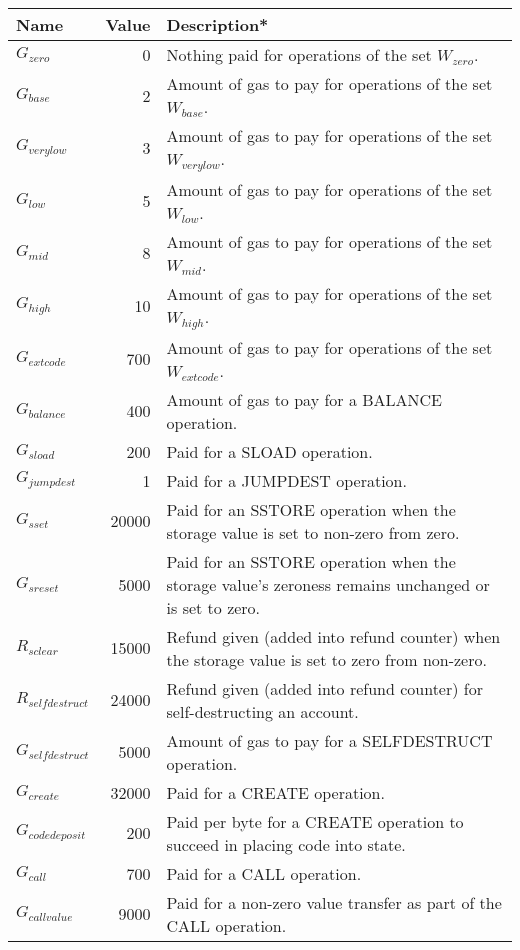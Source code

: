 \documentclass[9pt,oneside]{amsart}
\makeatletter
\newcommand{\linkdest}[1]{\Hy@raisedlink{\hypertarget{#1}{}}}
\makeatother
\begin{document}
\begin{tabular*}{\columnwidth}[h]{lrl}
\toprule
Name & Value & Description* \\
\midrule
$G_{zero}$ & 0 & Nothing paid for operations of the set {\small $W_{zero}$}. \\
$G_{base}$ & 2 & Amount of gas to pay for operations of the set {\small $W_{base}$}. \\
$G_{verylow}$ & 3 & Amount of gas to pay for operations of the set {\small $W_{verylow}$}. \\
$G_{low}$ & 5 & Amount of gas to pay for operations of the set {\small $W_{low}$}. \\
$G_{mid}$ & 8 & Amount of gas to pay for operations of the set {\small $W_{mid}$}. \\
$G_{high}$ & 10 & Amount of gas to pay for operations of the set {\small $W_{high}$}. \\
$G_{extcode}$ & 700 & Amount of gas to pay for operations of the set {\small $W_{extcode}$}. \\
$G_{balance}$ & 400 & Amount of gas to pay for a {\small BALANCE} operation. \\
$G_{sload}$ & 200 & Paid for a {\small SLOAD} operation. \\
$G_{jumpdest}$ & 1 & Paid for a {\small JUMPDEST} operation. \\
$G_{sset}$ & 20000 & Paid for an {\small SSTORE} operation when the storage value is set to non-zero from zero. \\
$G_{sreset}$ & 5000 & Paid for an {\small SSTORE} operation when the storage value's zeroness remains unchanged or is set to zero. \\
$R_{sclear}$ & 15000 & Refund given (added into refund counter) when the storage value is set to zero from non-zero. 
\linkdest{R__selfdestruct}{}\\$R_{selfdestruct}$ & 24000 & Refund given (added into refund counter) for self-destructing an account. \\
\linkdest{G__selfdestruct}{}$G_{selfdestruct}$ & 5000 & Amount of gas to pay for a {\small SELFDESTRUCT} operation. \\
$G_{create}$ & 32000 & Paid for a {\small CREATE} operation. \\
\linkdest{G__codedeposit}{}$G_{codedeposit}$ & 200 & Paid per byte for a {\small CREATE} operation to succeed in placing code into state. \\
$G_{call}$ & 700 & Paid for a {\small CALL} operation. \\
$G_{callvalue}$ & 9000 & Paid for a non-zero value transfer as part of the {\small CALL} operation. \\

\end{tabular*}
\end{document}
